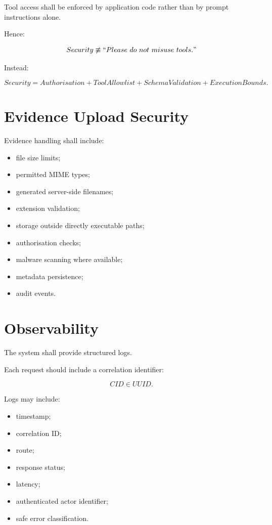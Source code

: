 \documentclass[11pt,a4paper]{article}
\begin{document}
Tool access shall be enforced by application code rather than by
prompt instructions alone.

Hence:

\[
Security
\not\equiv
``Please\ do\ not\ misuse\ tools."
\]

Instead:

\[
Security
=
Authorisation
+
ToolAllowlist
+
SchemaValidation
+
ExecutionBounds.
\]

\section{Evidence Upload Security}

Evidence handling shall include:

\begin{itemize}
    \item file size limits;
    \item permitted MIME types;
    \item generated server-side filenames;
    \item extension validation;
    \item storage outside directly executable paths;
    \item authorisation checks;
    \item malware scanning where available;
    \item metadata persistence;
    \item audit events.
\end{itemize}

\section{Observability}

The system shall provide structured logs.

Each request should include a correlation identifier:

\[
CID \in UUID.
\]

Logs may include:

\begin{itemize}
    \item timestamp;
    \item correlation ID;
    \item route;
    \item response status;
    \item latency;
    \item authenticated actor identifier;
    \item safe error classification.
\end{itemize}
\end{document}

